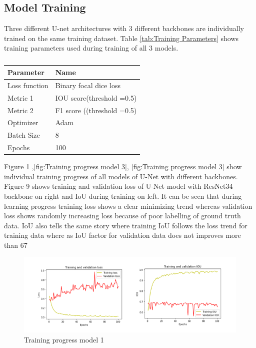 \documentclass[rnd]{mas_proposal}
\begin{document}
\subsection{Model Training}

Three different U-net architectures with 3 different backbones are individually trained on the same training dataset.  
Table \ref{tab:Training Parameters} shows training parameters used during training of  all 3 models.

\begin{table}[h]
        \centering
        \begin{tabular}{|l|l|}
        \hline
        \textbf{Parameter} & \textbf{Name}              \\ \hline
        Loss function      & Binary focal dice loss     \\ \hline
        Metric 1           & IOU score(threshold =0.5)  \\ \hline
        Metric 2           & F1 score ((threshold =0.5) \\ \hline
        Optimizer          & Adam                       \\ \hline
        Batch Size         & 8                          \\ \hline
        Epochs             & 100                        \\ \hline
        \end{tabular}
        \caption{}
        \label{tab:my-table}
        \end{table}



Figure \ref{fig:Training progress model 1} ,\ref{fig:Training progress model 3}, \ref{fig:Training progress model 3} show individual training progress of all models of U-Net with different backbones. Figure-9 shows training and validation loss of U-Net model
with ResNet34 backbone on right and IoU during training on left. It can be seen that during learning progress training loss shows a clear minimizing trend 
whereas validation loss shows randomly increasing loss because of poor labelling of ground truth data. IoU also tells the same story where training IoU
follows the loss trend for training data where as IoU factor for validation data does not improves more than 67%

\begin{figure}[htp] 
        \centering
        \includegraphics[width=1.2\textwidth]{images/fig9.png}
        \caption{Training progress model 1}%
        \label{fig:Training progress model 1}%
\end{figure}
\end{document}
